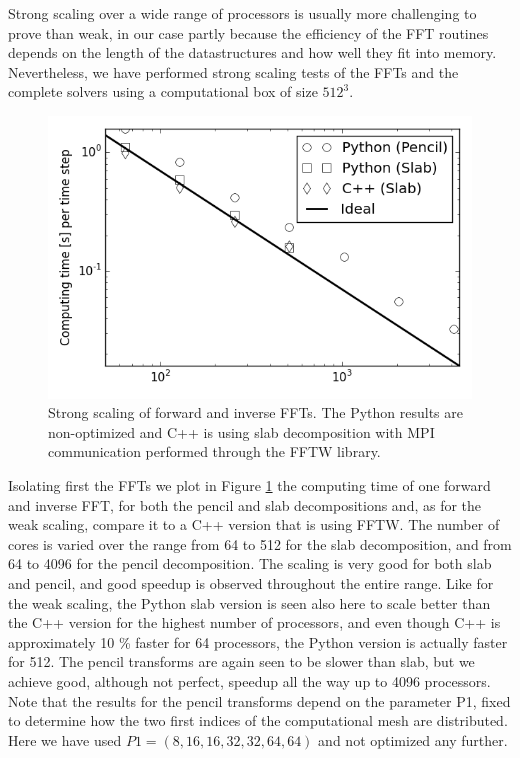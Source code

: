 \documentclass[final,3p,times,twocolumn]{elsarticle}
\begin{document}
Strong scaling over a wide range of processors is usually more challenging
to prove than weak, in our case partly because the efficiency of the FFT 
routines depends on the length of the datastructures and how well they fit into
memory. Nevertheless, we have performed strong scaling tests of the FFTs and the complete solvers using a computational box of size $512^3$. 

\begin{figure}[ht!]
	\centering
	\includegraphics[scale=0.44]{strong_scaling_fft_512.png}
	\caption{Strong scaling of forward and inverse FFTs. The Python results are 
	non-optimized and C++ is using slab 
		decomposition with MPI communication performed through the FFTW 
		library.}
	\label{fig:strong_FFT_scaling}
\end{figure}

Isolating first the FFTs we plot in Figure
\ref{fig:strong_FFT_scaling} the computing time of one forward and inverse FFT, for both the pencil and slab decompositions and, as for the weak scaling, compare it to a C++ version that is using FFTW. The number of
cores is varied over the range from 64 to 512 for the slab
decomposition, and from 64 to 4096 for the
pencil decomposition. The scaling is very good for both slab and pencil, and good speedup is observed
throughout the entire range. Like for the weak scaling, the Python slab version is seen also here to scale better than the C++ version for the highest number of processors, and even though C++ is approximately 10 \% faster for 64 processors, the Python version is actually faster for 512. The pencil transforms are again seen to be slower than slab, but we achieve good, although not perfect, speedup all the way up to 4096 processors. Note that the results for the pencil transforms depend on the parameter P1, fixed to determine how the two first indices of the computational mesh are distributed. Here we have used $P1 = (8, 16, 16, 32, 32, 64, 64)$ and not optimized any further.
\end{document}
